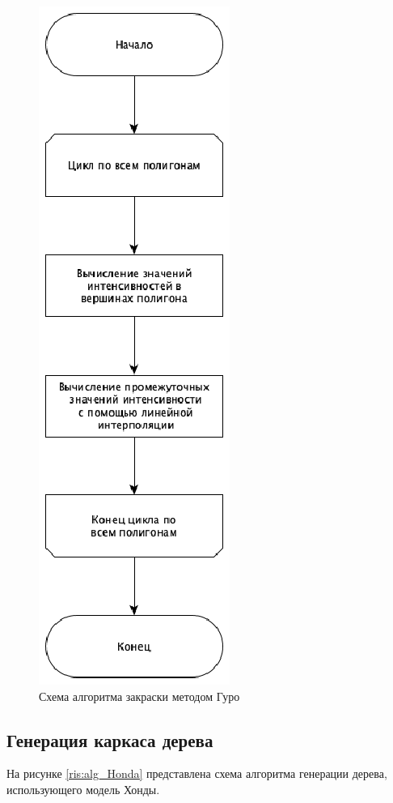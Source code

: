 \documentclass[54pt, a4paper]{article}
\begin{document}
	\begin{figure}[ht!]
		\centering
		\includegraphics[scale=1.5]{img/Guro.eps}
		\caption{Схема алгоритма закраски методом Гуро}
		\label{ris:Guro}
	\end{figure}
	
	
	\subsection{Генерация каркаса дерева}
	На рисунке \ref{ris:alg_Honda} представлена схема алгоритма генерации дерева, использующего модель Хонды.
	
	\newpage
	
\end{document}
